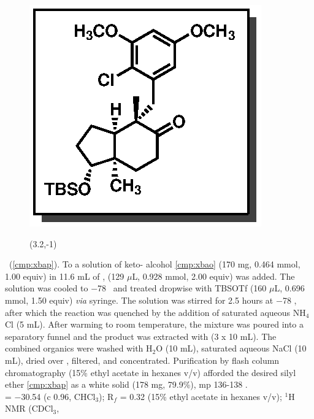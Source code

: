\vspace{10pt}
\begin{figure}
  \vspace{-25pt}
  \begin{center}
    \includegraphics[scale=0.8]{chp_singlecarbon/images/xbap}
    \begin{textblock}{1}(3.2,-1)  \end{textblock}
  \end{center}
  \vspace{-30pt}
\end{figure}\noindent \textbf{\CMPxbap}\ (\ref{cmp:xbap}). To a solution of keto-
alcohol \ref{cmp:xbao} (170 mg, 0.464 mmol, 1.00 equiv) in 11.6 mL of
,  (129 $\mu$L, 0.928 mmol, 2.00 equiv) was added. The
solution was cooled to $-$78 \degc\  and treated dropwise with TBSOTf
(160 $\mu$L, 0.696 mmol, 1.50 equiv) \textit{via} syringe. The solution was stirred
for 2.5 hours at $-$78 \degc, after which the reaction was quenched by the addition of saturated
aqueous NH$_4$Cl (5 mL). After warming to room temperature, the mixture was poured into a
separatory funnel and the product was extracted with  (3 x 10 mL). The combined
organics were washed with H$_2$O (10 mL), saturated aqueous NaCl (10 mL), dried over ,
filtered, and concentrated. Purification by flash column chromatography (15\% ethyl acetate in
hexanes v/v) afforded the desired silyl ether \ref{cmp:xbap} as a white solid (178 mg, 79.9\%), mp
136-138 \degc.\\
\rotation = $-$30.54 (c 0.96, CHCl$_3$); R$_f$ = 0.32 (15\% ethyl acetate in hexanes v/v); $^1$H NMR (CDCl$_3$,
